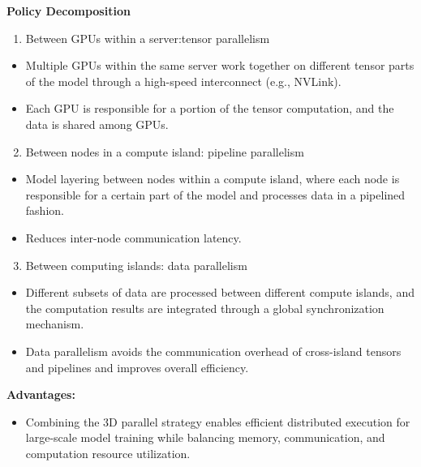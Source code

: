 \documentclass{article}
\begin{document}
\textbf{Policy Decomposition}
\begin{enumerate}
    \item Between GPUs within a server:tensor parallelism
\end{enumerate}
\begin{itemize}
    \item Multiple GPUs within the same server work together on different tensor parts of the model through a high-speed interconnect (e.g., NVLink).
\end{itemize}
\begin{itemize}
    \item Each GPU is responsible for a portion of the tensor computation, and the data is shared among GPUs.
\end{itemize}
\begin{enumerate}
\setcounter{enumi}{1}
    \item Between nodes in a compute island: pipeline parallelism
\end{enumerate}
\begin{itemize}
    \item Model layering between nodes within a compute island, where each node is responsible for a certain part of the model and processes data in a pipelined fashion.
\end{itemize}
\begin{itemize}
    \item Reduces inter-node communication latency.
\end{itemize}

\begin{enumerate}
\setcounter{enumi}{2}
    \item Between computing islands: data parallelism
\end{enumerate}
\begin{itemize}
    \item Different subsets of data are processed between different compute islands, and the computation results are integrated through a global synchronization mechanism.
\end{itemize}
\begin{itemize}
    \item Data parallelism avoids the communication overhead of cross-island tensors and pipelines and improves overall efficiency.
\end{itemize}

\textbf{Advantages:} 
    \begin{itemize}
            \item Combining the 3D parallel strategy enables efficient distributed execution for large-scale model training while balancing memory, communication, and computation resource utilization.
        \end{itemize}
    
\end{document}
